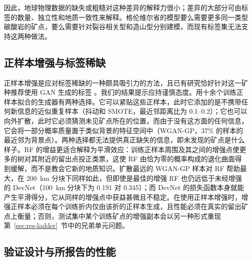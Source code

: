 \documentclass[pdflatex,sn-apa]{sn-jnl}
\begin{document}
因此，地球物理数据的缺失或粗糙对这种差异的解释力很小；差异的大部分可由标签的数量、独立性和地质一致性来解释。格伦维尔省的模型要么需要更多同一类型碳酸岩的矿点，要么需要针对裂谷相关型和造山型分别建模，而现有标签集无法支持这两种做法。

\subsection{正样本增强与标签稀缺}\label{sec:disc-gan}

正样本增强是应对标签稀缺的一种颇具吸引力的方法，且已有研究恰好针对这一矿种推荐使用 GAN 生成的标签 \citep{Parsa2025}。我们的结果提示应持谨慎态度。用十余个训练正样本拟合的生成器有两种选择。它可以紧贴这些正样本，此时它添加的是不携带任何新信息的近似重复样本（抖动和 SMOTE，最近邻距离比为 0.1--0.2）；它也可以向外扩散，此时它必须猜测未见矿点所在的位置，而由于没有这方面的任何信息，它会将一部分概率质量置于类似背景的特征空间中（WGAN-GP，37\% 的样本的最近邻为背景点）。两种选择都无法提供真正缺失的信息，即未发现的矿点是什么样子。RF 的增益更适合解释为平滑效应：训练正样本周围及其之间的增强点使更多的树对其附近的留出点投正类票，这使 RF 由恰为零的概率构成的退化曲面得到缓解，而不是教会它新的地质知识。扩散最远的 WGAN-GP 样本对 RF 帮助最大，在 200~km 分块下同样如此，但即使是最佳的增强 RF 也仍远低于未经增强的 DevNet（100~km 分块下为 0.191 对 0.345）；而 DevNet 的损失函数本身就能产生平滑得分，它从同样的增强点中获益甚微且不稳定。在使用正样本增强时，增强正样本必须在每个训练折内仅由该折的正样本生成，且性能必须在真实的留出矿点上衡量；否则，测试集中某个训练矿点的增强副本会以另一种形式重现第~\ref{sec:res-ladder}~节中的兄弟单元问题。

\subsection{验证设计与所报告的性能}\label{sec:disc-protocol}
\end{document}
